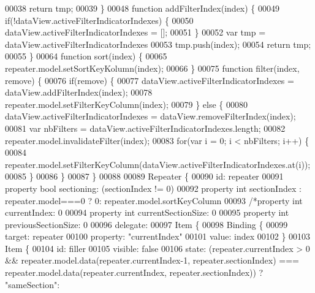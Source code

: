 \begin{DoxyCode}
00038         \textcolor{keywordflow}{return} tmp;
00039     \}
00048     \textcolor{keyword}{function} addFilterIndex(index) \{
00049         \textcolor{keywordflow}{if}(!dataView.activeFilterIndicatorIndexes) \{
00050             dataView.activeFilterIndicatorIndexes = [];
00051         \}
00052         var tmp = dataView.activeFilterIndicatorIndexes
00053         tmp.push(index);
00054         \textcolor{keywordflow}{return} tmp;
00055     \}
00064     \textcolor{keyword}{function} sort(index) \{
00065         repeater.model.setSortKeyKolumn(index);
00066     \}
00075     \textcolor{keyword}{function} filter(index, \textcolor{keyword}{remove}) \{
00076         \textcolor{keywordflow}{if}(\textcolor{keyword}{remove}) \{
00077             dataView.activeFilterIndicatorIndexes = dataView.addFilterIndex(index);
00078             repeater.model.setFilterKeyColumn(index);
00079         \} \textcolor{keywordflow}{else} \{
00080             dataView.activeFilterIndicatorIndexes = dataView.removeFilterIndex(index);
00081             var nbFilters = dataView.activeFilterIndicatorIndexes.length;
00082             repeater.model.invalidateFilter(index);
00083             \textcolor{keywordflow}{for}(var i = 0; i < nbFilters; i++) \{
00084                 repeater.model.setFilterKeyColumn(dataView.activeFilterIndicatorIndexes.at(i));
00085             \}
00086         \}
00087     \}
00088 
00089     Repeater \{
00090         \textcolor{keywordtype}{id}: repeater
00091         \textcolor{keyword}{property} \textcolor{keywordtype}{bool} sectioning: (sectionIndex != 0)
00092         property \textcolor{keywordtype}{int} sectionIndex : repeater.model===0 ? 0: repeater.model.sortKeyColumn
00093         \textcolor{comment}{/*property int currentIndex: 0}
00094 \textcolor{comment}{        property int currentSectionSize: 0}
00095 \textcolor{comment}{        property int previousSectionSize: 0}
00096 \textcolor{comment}{        delegate:}
00097 \textcolor{comment}{            Item \{}
00098 \textcolor{comment}{            Binding \{}
00099 \textcolor{comment}{                target: repeater}
00100 \textcolor{comment}{                property: "currentIndex"}
00101 \textcolor{comment}{                value: index}
00102 \textcolor{comment}{            \}}
00103 \textcolor{comment}{            Item \{}
00104 \textcolor{comment}{                id: filler}
00105 \textcolor{comment}{                visible: false}
00106 \textcolor{comment}{                state: (repeater.currentIndex > 0 && repeater.model.data(repeater.currentIndex-1,
       repeater.sectionIndex) === repeater.model.data(repeater.currentIndex, repeater.sectionIndex)) ? "sameSection":
}
\end{DoxyCode}
